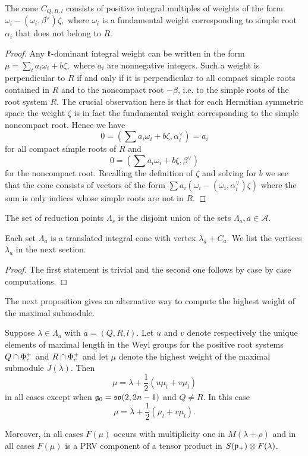 \begin{lemma}
The cone $C_{Q, R, l}$ consists of positive integral multiples of weights of the form $\omega_i - (\omega_i, \beta^\vee) \zeta,$ where $\omega_i$ is a fundamental weight corresponding to simple root $\alpha_i$ that does not belong to $R$.
\end{lemma}
\begin{proof}
 Any  $\mathfrak{k}$-dominant integral weight can be written in the form $\mu = \sum_i a_i \omega_i + b \zeta,$ where $a_i$ are nonnegative integers. Such a weight is perpendicular to $R$ if and only if it is perpendicular to all compact simple roots contained in $R$ and to the noncompact root $-\beta$, i.e. to the simple roots of the root system $R$. The crucial observation here is that for each Hermitian symmetric space the weight $\zeta$ is in fact the fundamental weight corresponding to the simple noncompact root. Hence we have 
\[
0 = \left(\sum a_i \omega_i + b \zeta, \alpha_i^\vee \right) = a_i 
\] 
for all compact simple roots of  $R$ and 
\[
0 = \left(\sum a_i \omega_i + b \zeta, \beta^\vee \right)
\]
for the noncompact root. Recalling the definition of $\zeta$ and solving for $b$ we see that the cone consists of vectors of the form $\sum a_i (\omega_i - (\omega_i, \alpha_i^\vee)\zeta)$ where the sum is only indices whose simple roots are not in $R$.
\end{proof}

\begin{proposition}
 The set of reduction points $\Lambda_r$ is the disjoint union of the sets $\Lambda_a, a\in\mathcal{A}$.

 Each set $\Lambda_a$ is a translated integral cone with vertex $\lambda_a + C_a$. We list the vertices $\lambda_a$ in the next section.
\end{proposition}
\begin{proof}
 The first statement is trivial and the second one follows by case by case computations.
\end{proof}

The next proposition gives an alternative way to compute the highest weight of the maximal submodule.

\begin{proposition}
 Suppose $\lambda\in\Lambda_a$ with $a=(Q,R,l)$. Let $u$ and $v$ denote respectively the unique elements of maximal length in the Weyl groups for the positive root systems $Q\cap \Phi^+_c$ and $R\cap \Phi^+_c$ and let $\mu$ denote the highest weight of the maximal submodule $J(\lambda)$. Then
 \[
  \mu = \lambda + \frac{1}{2}(u \mu_l + v \mu_l)
 \]
 in all cases except when $\mathfrak{g}_0=\mathfrak{so}(2,2n-1)$ and $Q\neq R$. In this case
 \[
  \mu = \lambda + \frac{1}{2}(\mu_l + v\mu_l).
 \]

 Moreover, in all cases $F(\mu)$ occurs with multiplicity one in $M(\lambda+\rho)$ and in all cases $F(\mu)$ is a PRV component of a tensor product in $S(\mathfrak{p}_+)\otimes F(\lambda)$.
\end{proposition}

